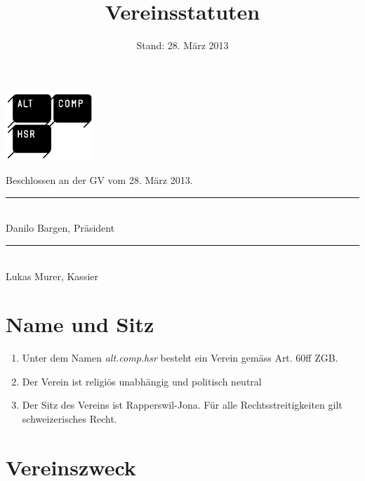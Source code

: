 \documentclass[10pt,a4paper,parskip,fleqn]{scrartcl}
\title{\Huge Vereinsstatuten}
\date{Stand: 28. März 2013}
\newcommand{\ol}{\begin{enumerate}[itemsep=-0.2em,topsep=-0.2em]}
\newcommand{\lo}{\end{enumerate}}
\newcommand{\li}{\item}
\begin{document}
\begin{titlepage}

	\maketitle
	\thispagestyle{empty} %

  \begin{center}

    \includegraphics[width=0.25\textwidth]{logo.png}\\

		\vfill

		\large Beschlossen an der GV vom 28. März 2013.

		\vspace{1.5cm}

		\begin{minipage}[t]{0.49\textwidth}
			\center
			\rule{5cm}{0.2mm}\\
			Danilo Bargen, Präsident
		\end{minipage}
		\begin{minipage}[t]{0.49\textwidth}
			\center
			\rule{5cm}{0.2mm}\\
			Lukas Murer, Kassier
		\end{minipage}

  \end{center}

\end{titlepage}


\section{Name und Sitz}

\ol
  \li Unter dem Namen \textit{alt.comp.hsr} besteht ein Verein gemäss Art. 60ff
  ZGB.
  \li Der Verein ist religiös unabhängig und politisch neutral
  \li Der Sitz des Vereins ist Rapperswil-Jona. Für alle Rechtsstreitigkeiten
  gilt schweizerisches Recht.
\lo


\section{Vereinszweck}
\end{document}
